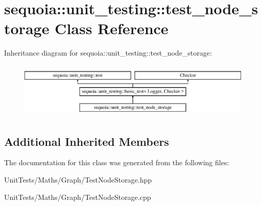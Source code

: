 \hypertarget{classsequoia_1_1unit__testing_1_1test__node__storage}{}\section{sequoia\+::unit\+\_\+testing\+::test\+\_\+node\+\_\+storage Class Reference}
\label{classsequoia_1_1unit__testing_1_1test__node__storage}
Inheritance diagram for sequoia\+::unit\+\_\+testing\+::test\+\_\+node\+\_\+storage\+:\begin{figure}[H]
\begin{center}
\leavevmode
\includegraphics[height=2.666667cm]{classsequoia_1_1unit__testing_1_1test__node__storage}
\end{center}
\end{figure}
\subsection*{Additional Inherited Members}


The documentation for this class was generated from the following files\+:\begin{DoxyCompactItemize}
\item 
Unit\+Tests/\+Maths/\+Graph/Test\+Node\+Storage.\+hpp\item 
Unit\+Tests/\+Maths/\+Graph/Test\+Node\+Storage.\+cpp\end{DoxyCompactItemize}
